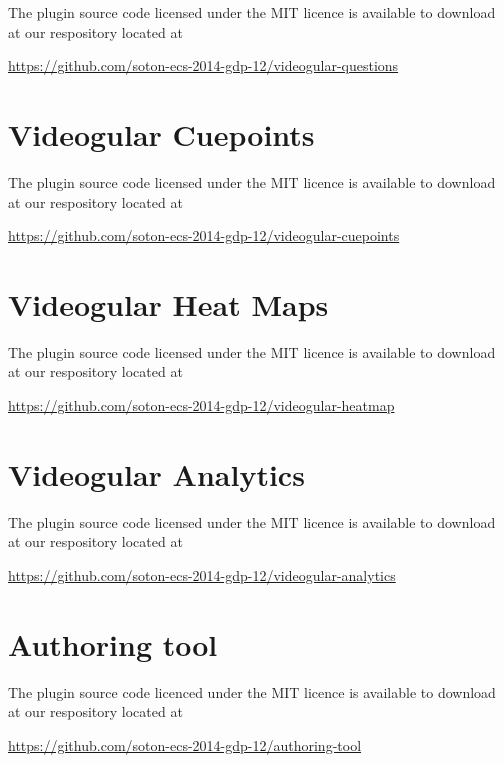 \documentclass[12pt,a4paper]{article}
\begin{document}
The plugin source code licensed under the MIT licence is available to download at our respository located at 

\url{https://github.com/soton-ecs-2014-gdp-12/videogular-questions}

\section*{Videogular Cuepoints}

The plugin source code licensed under the MIT licence is available to download at our respository located at 

\url{https://github.com/soton-ecs-2014-gdp-12/videogular-cuepoints}

\section*{Videogular Heat Maps}

The plugin source code licensed under the MIT licence is available to download at our respository located at 

\url{https://github.com/soton-ecs-2014-gdp-12/videogular-heatmap}

\section*{Videogular Analytics}

The plugin source code licensed under the MIT licence is available to download at our respository located at 

\url{https://github.com/soton-ecs-2014-gdp-12/videogular-analytics}

\section*{Authoring tool}

The plugin source code licenced under the MIT licence is available to download at our respository located at 

\url{https://github.com/soton-ecs-2014-gdp-12/authoring-tool}
\end{document}

